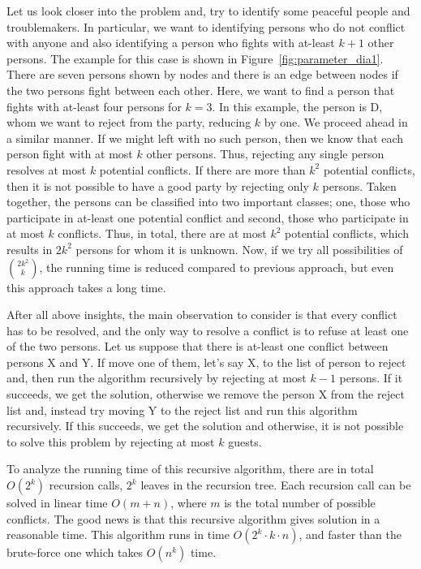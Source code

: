 Let us look closer into the problem and, try to identify some peaceful people and troublemakers.
In particular, we want to identifying persons who do not conflict with anyone and also identifying a person who fights with at-least $k+1$ other persons.
The example for this case is shown in Figure~\ref{fig:parameter_dia1}. 
There are seven persons shown by nodes and there is an edge between nodes if the two persons fight between each other.
Here, we want to find a person that fights with at-least four persons for $k=3$. In this example, the person is D, whom we want to reject from the party, reducing $k$ by one.
We proceed ahead in a similar manner. If we might left with no such person, then we know that each person fight with at most $k$ other persons.
Thus, rejecting any single person resolves at most $k$ potential conflicts.
If there are more than $k^2$ potential conflicts, then it is not possible to have a good party by rejecting only $k$ persons.
Taken together, the persons can be classified into two important classes; one, those who participate in at-least one potential conflict and second, those who participate in at most $k$ conflicts. 
Thus, in total, there are at most $k^2$ potential conflicts, which results in $2k^2$ persons for whom it is unknown.
Now, if we try all possibilities of $2k^2 \choose k$, the running time is reduced compared to previous approach, but even this approach takes a long time.

After all above insights, the main observation to consider is that every conflict has to be resolved, and the only way to resolve a conflict is to refuse at least one of the two persons.
Let us suppose that there is at-least one conflict between persons X and Y. 
If move one of them, let's say X, to the list of person to reject and, then run the algorithm recursively by rejecting at most $k-1$ persons.
If it succeeds, we get the solution, otherwise we remove the person X from the reject list and, instead try moving Y to the reject list and run this algorithm recursively.
If this succeeds, we get the solution and otherwise, it is not possible to solve this problem by rejecting at most $k$ guests.

To analyze the running time of this recursive algorithm, there are in total $O(2^k)$ recursion calls, $2^k$ leaves in the recursion tree.
Each recursion call can be solved in linear time $O(m+n)$, where $m$ is the total number of possible conflicts.
The good news is that this recursive algorithm gives solution in a reasonable time.
This algorithm runs in time $O(2^k \cdot k \cdot n)$, 
and faster than the brute-force one which takes $O(n^k)$ time.


